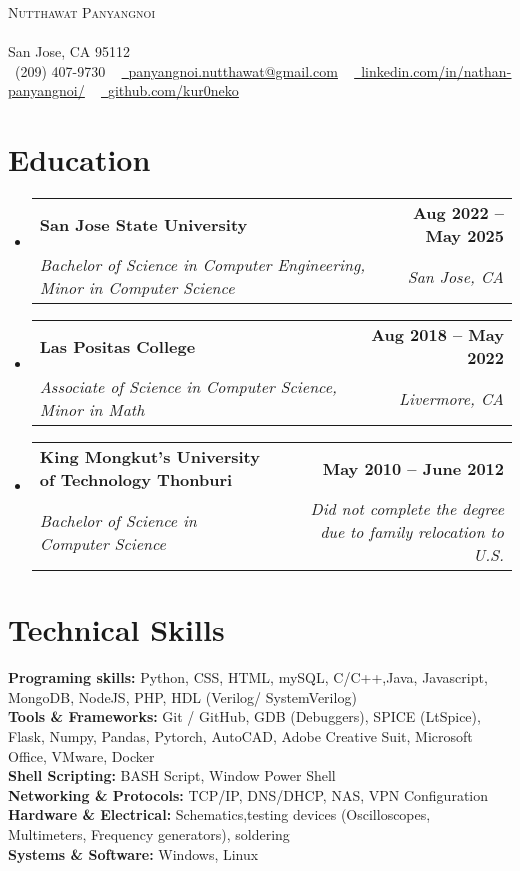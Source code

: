 \documentclass[letterpaper,11pt]{article}
\makeatletter
\newcommand{\resumeSubheading}[4]{
  \vspace{-2pt}\item
    \begin{tabular*}{1.0\textwidth}[t]{l@{\extracolsep{\fill}}r}
      \textbf{#1} & \textbf{\small #2} \\
      \textit{\small#3} & \textit{\small #4} \\
    \end{tabular*}\vspace{-7pt}
}
\newcommand{\resumeSubHeadingListStart}{\begin{itemize}[leftmargin=0.0in, label={}]}
\newcommand{\resumeSubHeadingListEnd}{\end{itemize}}
\makeatother
\begin{document}
\vspace{-10pt}
\begin{center}
    {\Huge \scshape Nutthawat Panyangnoi}\\ 
    \vspace{1pt}{https://kur0neko.com}\\ \vspace{1pt} 
    \vspace{0.5pt} San Jose, CA 95112 \\ \vspace{0.5pt}
    \small \raisebox{-0.1\height}\faPhone\ (209) 407-9730 ~ \href{mailto:panyangnoi.nutthawat@gmail.com}{\raisebox{-0.2\height}\faEnvelope\  \underline{panyangnoi.nutthawat@gmail.com}} ~ 
    \href{https://www.linkedin.com/in/nathan-panyangnoi/}{\raisebox{-0.2\height}\faLinkedin\ \underline{linkedin.com/in/nathan-panyangnoi/}}  ~
    \href{https://github.com/kur0neko}{\raisebox{-0.2\height}\faGithub\ \underline{github.com/kur0neko}}
    \vspace{-8pt}
\end{center}


\section{Education}
  \resumeSubHeadingListStart
    \resumeSubheading
      {San Jose State University}{Aug 2022 -- May 2025}
      {Bachelor of Science in Computer Engineering, Minor in Computer Science}{San Jose, CA}
      \resumeSubheading
      {Las Positas College}{Aug 2018 -- May 2022}
      {Associate of Science in Computer Science, Minor in Math}{Livermore, CA}
      \resumeSubheading
      {King Mongkut’s University of Technology Thonburi}{May 2010 -- June 2012}
      {Bachelor of Science in Computer Science} {Did not complete the degree due to family relocation to U.S.}
  \resumeSubHeadingListEnd

\section{Technical Skills}
\begin{itemize}[left=0.15in, label={}]
    \small{
    \item \textbf{Programing skills:} Python, CSS, HTML, mySQL, C/C++,Java, Javascript, MongoDB, NodeJS, PHP, HDL (Verilog/ SystemVerilog) \\
    \textbf{Tools \& Frameworks:} Git / GitHub, GDB (Debuggers), SPICE (LtSpice), Flask, Numpy, Pandas, Pytorch, AutoCAD, Adobe Creative Suit, Microsoft Office, VMware, Docker  \\
    \textbf{Shell Scripting:} BASH Script, Window Power Shell \\
    \textbf{Networking \& Protocols:} TCP/IP, DNS/DHCP, NAS, VPN Configuration \\
    \textbf{Hardware \& Electrical:} Schematics,testing devices (Oscilloscopes, Multimeters, Frequency generators), soldering \\
    \textbf{Systems \& Software:} Windows, Linux \\
    }
\end{itemize}
\vspace{-15pt}
\end{document}

